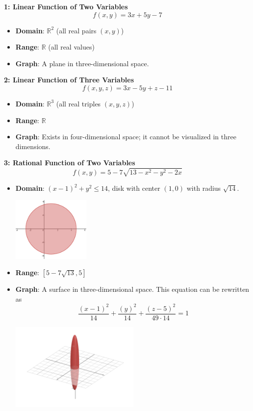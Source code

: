 \textbf{1: Linear Function of Two Variables}
    \[
    f(x, y) = 3x + 5y - 7
    \]
    \begin{itemize}
        \item \textbf{Domain}: \(\mathbb{R}^2\) (all real pairs \((x, y)\))
        \item \textbf{Range}: \(\mathbb{R}\) (all real values)
        \item \textbf{Graph}: A plane in three-dimensional space.
    \end{itemize}

\textbf{2: Linear Function of Three Variables}
    \[
    f(x, y, z) = 3x - 5y + z - 11
    \]
    \begin{itemize}
        \item \textbf{Domain}: \(\mathbb{R}^3\) (all real triples \((x, y, z)\))
        \item \textbf{Range}: \(\mathbb{R}\)
        \item \textbf{Graph}: Exists in four-dimensional space; it cannot be visualized in three dimensions.
    \end{itemize}
\textbf{3: Rational Function of Two Variables}
    \[
        f(x, y) = 5 - 7 \sqrt{13-x^2-y^2-2x}
    \]
    \begin{itemize}
        \item \textbf{Domain}: $(x-1)^2+y^2 \leq 14$, disk with center $(1, 0)$ with radius $\sqrt{14}$.
        \begin{center}
            \includegraphics[width=0.3\textwidth]{domain1.png}
        \end{center}
        \item \textbf{Range}: $\left[5-7\sqrt{13}, 5\right]$
        \item \textbf{Graph}: A surface in three-dimensional space. This equation can be rewritten as 
        \[
            \dfrac{\left(x-1\right)^{2}}{14}+\dfrac{\left(y\right)^{2}}{14}+\dfrac{\left(z-5\right)^{2}}{49\cdot14}=1
        \] 
        \begin{center}
            \includegraphics[width=0.5\textwidth]{graph1.png}
        \end{center}
    \end{itemize}


